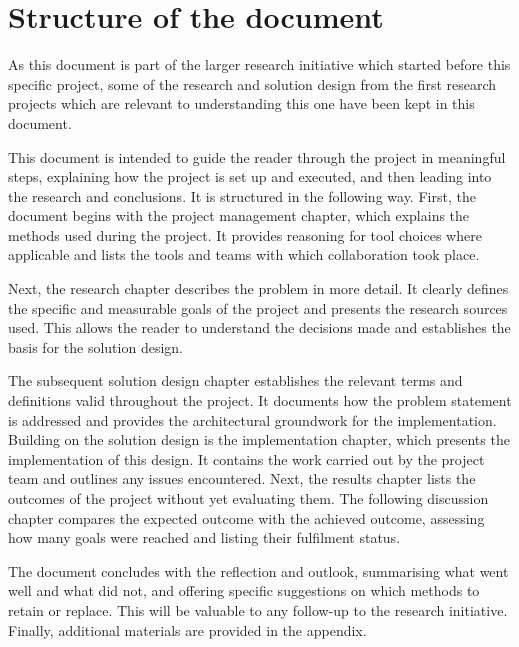 
\section{Structure of the document}

As this document is part of the larger research initiative which started before this specific project, some of the research and solution design from the first research projects which are relevant to understanding this one have been kept in this document.

This document is intended to guide the reader through the project in meaningful steps, explaining how the project is set up and executed, and then leading into the research and conclusions. It is structured in the following way. First, the document begins with the project management chapter, which explains the methods used during the project. It provides reasoning for tool choices where applicable and lists the tools and teams with which collaboration took place.

Next, the research chapter describes the problem in more detail. It clearly defines the specific and measurable goals of the project and presents the research sources used. This allows the reader to understand the decisions made and establishes the basis for the solution design.

The subsequent solution design chapter establishes the relevant terms and definitions valid throughout the project. It documents how the problem statement is addressed and provides the architectural groundwork for the implementation. Building on the solution design is the implementation chapter, which presents the implementation of this design. It contains the work carried out by the project team and outlines any issues encountered. Next, the results chapter lists the outcomes of the project without yet evaluating them. The following discussion chapter compares the expected outcome with the achieved outcome, assessing how many goals were reached and listing their fulfilment status.

The document concludes with the reflection and outlook, summarising what went well and what did not, and offering specific suggestions on which methods to retain or replace. This will be valuable to any follow-up to the research initiative. Finally, additional materials are provided in the appendix.
